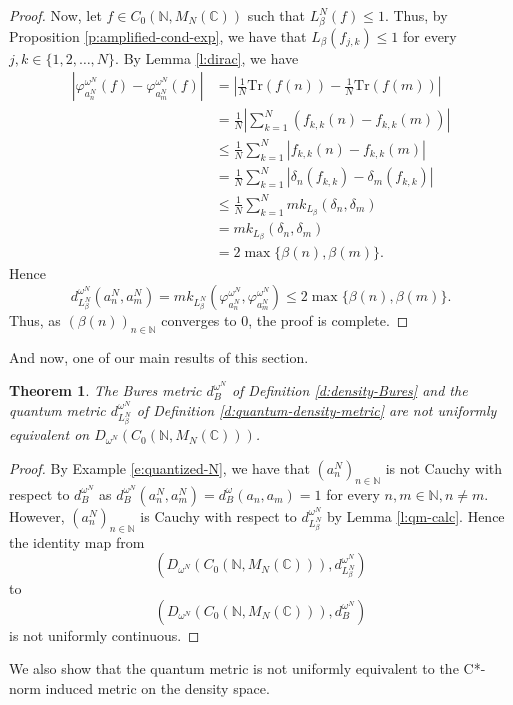 \documentclass{amsart}
\theoremstyle{plain}
\newtheorem{theorem}{Theorem}[section]
\theoremstyle{definition}
\theoremstyle{remark}
\numberwithin{equation}{section}
\newcommand{\be}{{\beta}}
\newcommand{\om}{{\omega}}
\newcommand{\de}{{\delta}}
\newcommand{\vhi}{{\varphi}}
\newcommand{\N}{{\mathds{N}}}
\newcommand{\C}{{\mathds{C}}}
\renewcommand{\leq}{\leqslant}
\begin{document}
\begin{proof}
    
    Now, let $f\in C_0(\N, M_N(\C))$ such that $L_\be^N(f)\leq 1$. Thus, by Proposition \ref{p:amplified-cond-exp}, we have that $L_\be(f_{j,k})\leq 1$ for every $j,k\in \{1,2,\ldots, N\}$. By Lemma \ref{l:dirac}, we have   
    \begin{align*}
        \left| \vhi^{\om^N}_{a_n^N}(f)-\vhi^{\om^N}_{a_m^N}(f)\right|& =\left| \frac{1}{N}\mathrm{Tr}(f(n))-\frac{1}{N}\mathrm{Tr}(f(m))\right|\\
        & =\frac{1}{N}\left| \sum_{k=1}^N (f_{k,k}(n)- f_{k,k}(m))\right|\\
        & \leq \frac{1}{N} \sum_{k=1}^N \left| f_{k,k}(n)- f_{k,k}(m)\right|\\
        & = \frac{1}{N} \sum_{k=1}^N \left| \de_n(f_{k,k})- \de_m(f_{k,k})\right|\\
        & \leq  \frac{1}{N} \sum_{k=1}^N mk_{L_\be}(\de_n, \de_m)\\
        & =  mk_{L_\be}(\de_n, \de_m)\\
        & = 2\max\{\be(n), \be(m)\}.
    \end{align*}
    Hence 
    \[
   d_{L_{\be}^N}^{\om^N}(a_n^N, a_m^N)= mk_{L_\be^N}\left( \vhi^{\om^N}_{a_n^N},\vhi^{\om^N}_{a_m^N} \right)\leq 2\max\{\be(n), \be(m)\}.
    \]
    Thus, as $(\be(n))_{n\in \N}$ converges to $0$, the proof is complete.
\end{proof}
And now, one of our main results of this section.   
\begin{theorem}\label{t:non-uniform}
    The Bures metric $d_B^{\om^N}$ of Definition \ref{d:density-Bures} and the quantum metric $d_{L^N_\be}^{\om^N}$ of Definition \ref{d:quantum-density-metric} are not uniformly equivalent on $D_{\om^N}(C_0(\N, M_N(\C)))$.
\end{theorem}
\begin{proof}
    By Example \ref{e:quantized-N}, we have that $(a^N_n)_{n\in \N}$ is not Cauchy with respect to $d_B^{\om^N}$ as $d_B^{\om^N}(a^N_n,a^N_m)=d^\om_B(a_n,a_m)=1$ for every $n,m\in \N,n \neq m$. However, $(a^N_n)_{n\in \N}$ is   Cauchy with respect to $d_{L^N_\be}^{\om^N}$ by Lemma \ref{l:qm-calc}. 
    Hence the identity map from \[(D_{\om^N}(C_0(\N, M_N(\C))),d_{L^N_\be}^{\om^N}) \] to  \[(D_{\om^N}(C_0(\N, M_N(\C))), d_B^{\om^N})\] is not uniformly continuous.
\end{proof}
We also show that the quantum metric   is not uniformly equivalent to the C*-norm induced metric on the density space.
\end{document}
